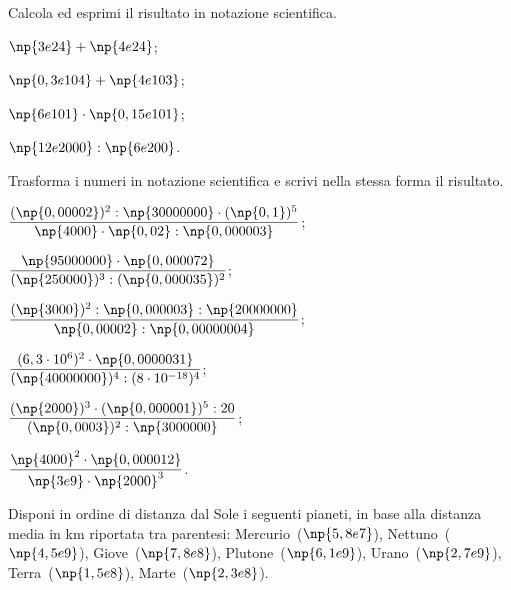 \begin{esercizio}
 \label{ese:3.72}
Calcola ed esprimi il risultato in notazione scientifica.
\begin{multicols}{2}
\begin{enumeratea}
\item $\np{3e24}+\np{4e24}$;
\item $\np{0,3e104}+\np{4e103}$;
\item $\np{6e101}\cdot\np{0,15e101}$;
\item $\np{12e2000}:\np{6e200}$.
\end{enumeratea}
\end{multicols}
\end{esercizio}

\begin{esercizio}[\Ast]
 \label{ese:3.73}
Trasforma i numeri in notazione scientifica e scrivi nella stessa forma il risultato.
\begin{multicols}{2}
\begin{enumeratea}
\item $\dfrac{(\np{0,00002})^2:\np{30000000} \cdot (\np{0,1})^5}{\np{4000} \cdot \np{0,02}:\np{0,000003}}$;\vspace{1.1ex}
\item $\dfrac{\np{95000000}\cdot\np{0,000072}}{(\np{250000})^{3} :(\np{0,000035})^{2}}$;\vspace{1.1ex}
\item $\dfrac{(\np{3000})^2:\np{0,000003}:\np{20000000}}{\np{0,00002}:\np{0,00000004}}$;
\item $\dfrac{(6,3\cdot10^{6})^{2}\cdot \np{0,0000031}}{(\np{40000000})^4 : (8\cdot 10^{-18})^{4}}$;\vspace{1.1ex}
\item $\dfrac{(\np{2000})^3 \cdot (\np{0,000001})^5:20}{(\np{0,0003})^2:\np{3000000}}$;\vspace{1.1ex}
\item $\dfrac{\np{4000}^2\cdot \np{0,000012}}{\np{3e9}\cdot \np{2000}^3}$.
\end{enumeratea}
\end{multicols}
\end{esercizio}

\begin{esercizio}
 \label{ese:3.74}
Disponi in ordine di distanza dal Sole i seguenti pianeti, in base alla distanza media in km riportata
tra parentesi: Mercurio~($\np{5,8e7}$), Nettuno~($\np{4,5e9}$), Giove~($\np{7,8e8}$),
Plutone~($\np{6,1e9}$), Urano~($\np{2,7e9}$), Terra~($\np{1,5e8}$), Marte~($\np{2,3e8}$).
\end{esercizio}

